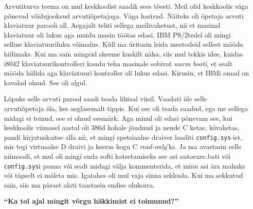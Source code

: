 Arvutiturva teema on mul keskkoolist saadik sees tõesti. Meil olid keskkoolis väga põnevad võidujooksud arvutiõpetajaga. Väga harivad. Näiteks oli õpetaja arvuti klaviatuur parooli all. Aegajalt tehti sellega meilivahetust, nii et masinal klaviatuur oli lukus aga muidu masin töötas edasi. IBM PS/2tedel oli mingi selline klaviatuuriluku võimalus. Küll ma üritasin leida meetodeid sellest mööda hiilimaks. Kui ma sain mingeid skeeme kuskilt näha, siis mul tekkis idee, kuidas i8042 klaviatuurikontrolleri kaudu teha masinale sobivat \emph{warm booti}, et sealt mööda hiilida aga klaviatuuri kontroller oli lukus edasi. Kirusin, et IBMi omad on kavalad olnud. See oli algul. 

Lõpuks selle arvuti parool saadi teada lihtsal viisil. Vaadati üle selle arvutiõpetaja õla, kes aeglasemalt tippis. Kui see oli teada saadud, ega me sellega midagi ei teinud, see ei olnud eesmärk. Aga minul oli edasi põnevam see, kui keskkoolis viimasel aastal oli 386d kohale jõudnud ja nende C ketas, kõvaketas, pandi kirjutuskaitse alla nii, et mingi spetsiaalne draiver laaditi \verb|config.sys|-ist, mis tegi virtuaalse D draivi ja keeras kogu C \emph{read-only}'ks. Ja ma avastasin selle niimoodi, et mul oli mingi enda softi katsetamiseks see asi autoexec.bati või \verb|config.sys|i panna või sealt midagi välja kommenterida, et minu asi ära mahuks või täpselt ei mäleta mis. Igatahes oli mul vaja sinna sekkuda. Kui ma sekkutud sain, siis ma pärast alati taastasin endise olukorra. 

\textbf{\enquote{Ka tol ajal mingit võrgu häkkimist ei toimunud?}}

